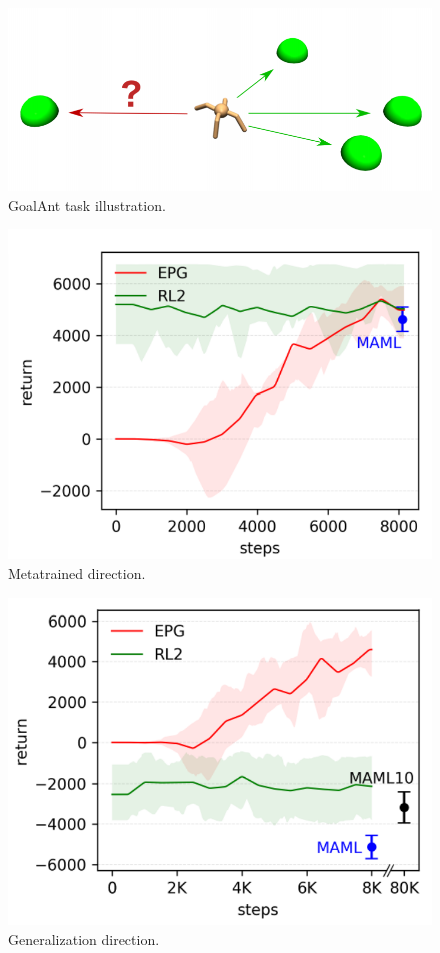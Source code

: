 \begin{figure}[H]
	\includegraphics[scale=0.5]{goal-ant-task.png}
	\centering
	\caption{GoalAnt task illustration.}
	\label{goal-ant}
\end{figure}
\begin{figure}[H]
	\includegraphics[scale=0.5]{metatrained-direction.png}
	\centering
	\caption{Metatrained direction.}
	\label{metatrained-direction}
\end{figure}
\begin{figure}[H]
	\includegraphics[scale=0.5]{generalization-direction.png}
	\centering
	\caption{Generalization direction.}
	\label{generalization-direction}
\end{figure}